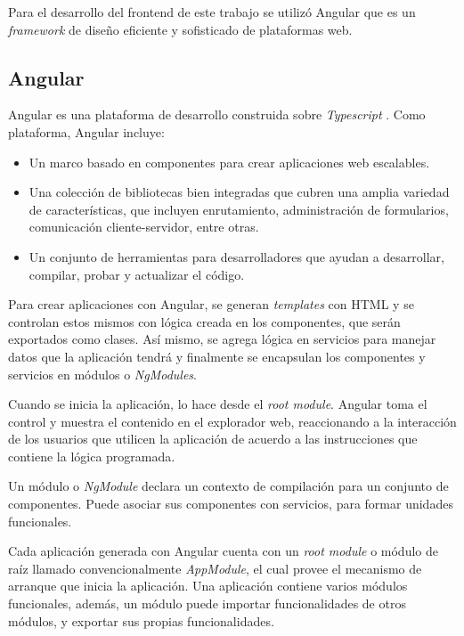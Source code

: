 Para el desarrollo del frontend de este trabajo se utilizó Angular \citep{WEBSITE:29} que es un \textit{framework} de diseño eficiente y sofisticado de plataformas web. 

\subsection{Angular}

Angular es una plataforma de desarrollo construida sobre \textit{Typescript} \citep{WEBSITE:30}. Como plataforma, Angular incluye:

\begin{itemize}
	\item Un marco basado en componentes para crear aplicaciones web escalables.
	
	\item Una colección de bibliotecas bien integradas que cubren una amplia variedad de características, que incluyen enrutamiento, administración de formularios, comunicación cliente-servidor, entre otras.
	
	\item Un conjunto de herramientas para desarrolladores que ayudan a desarrollar, compilar, probar y actualizar el código.
	
\end{itemize}

Para crear aplicaciones con Angular, se generan \textit{templates} con HTML y se controlan estos mismos con lógica creada en los componentes, que serán exportados como clases. Así mismo, se agrega lógica en servicios para manejar datos que la aplicación tendrá y finalmente se encapsulan los componentes y servicios en módulos o \textit{NgModules}.

Cuando se inicia la aplicación, lo hace desde el \textit{root module}. Angular toma el control y muestra el contenido en el explorador web, reaccionando a la interacción de los usuarios que utilicen la aplicación de acuerdo a las instrucciones que contiene la lógica programada.

Un módulo o \textit{NgModule} declara un contexto de compilación para un conjunto de componentes. Puede asociar sus componentes con servicios, para formar unidades funcionales. 

Cada aplicación generada con Angular cuenta con un \textit{root module} o módulo de raíz llamado convencionalmente \textit{AppModule}, el cual provee el mecanismo de arranque que inicia la aplicación. Una aplicación contiene varios módulos funcionales, además, un módulo puede importar funcionalidades de otros módulos, y exportar sus propias funcionalidades. 


